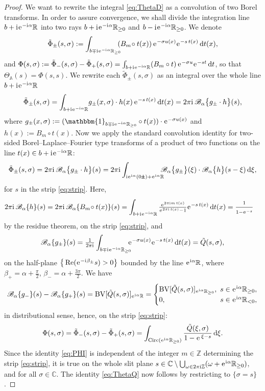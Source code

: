 \documentclass[a4paper,11pt]{amsart}
\numberwithin{equation}{section}
\newcommand{\C}{{\mathbb C}}
\newcommand{\Z}{{\mathbb Z}}
\newcommand{\R}{{\mathbb R}}
\newcommand{\mfrac}[2]{\tfrac{#1\strut}{#2\strut}}
\newcommand{\sminus}{\setminus} %
\renewcommand{\Re}{\operatorname{Re}}
\renewcommand{\i}{\mathrm{i}\mkern.25\thinmuskip}
\renewcommand{\d}{\ensuremath{\operatorname{d}\!}}
\newcommand{\e}{\ensuremath{\mkern.25\thinmuskip\mathrm{e}\mkern.4\thinmuskip}}
\newcommand{\orbit}{\mathbb{A}}
\newcommand{\Borel}{\mathscr{B}}
\newcommand{\BV}{\operatorname{BV}}
\newcommand{\Circ}{\operatorname{Circ}}
\newcommand{\pms}{{\scalebox{0.7}{$\pmb{\pm}$}}}
\theoremstyle{definition}
\begin{document}
\begin{proof}
We want to rewrite the integral \eqref{eq:ThetaD} as a convolution of two Borel transforms. In order to assure convergence, we shall divide the integration line $b+\i\e^{-\i\alpha}\R$ into two rays 
$b+\i\e^{-\i\alpha}\R_{\geq 0}$ and $b-\i \e^{-\i\alpha}\R_{\geq 0}$. 
We denote
\[\tilde\Phi_\pm(s,\sigma):=\int_{b\mp\i \e^{-\i\alpha}\R_{\geq 0}}\!\!\!(B_m\!\circ t(x))\,\e^{-\sigma u(x)}\e^{-s\,t(x)}\d t(x),\]
and $\Phi(s,\sigma):=\tilde\Phi_-(s,\sigma)-\tilde\Phi_+(s,\sigma)=\int_{b+\i\e^{-\i\alpha}\R}(B_m\circ t)\,\e^{-\sigma u}\e^{-st}\d t$, so that $\Theta_\orbit(s)=\Phi(s,s)$.
We rewrite each $\tilde\Phi_\pm(s,\sigma)$ as an integral over the whole line $b+\i\e^{-\i\alpha}\R$
\[\tilde\Phi_\pm(s,\sigma)=\int_{b+\i\e^{-\i\alpha}\R}\!
g_\pm(x,\sigma)\cdot h(x)\,\e^{-s\,t(x)}\d t(x)=
2\pi\i\,\Borel_\alpha\big\{g_\pm\cdot h\big\}(s),
\]
where
$g_\pm(x,\sigma):= (\mathbbm{1}_{b\mp\i\e^{-\i\alpha}\R_{\geq 0} } \circ t(x))\cdot\e^{-\sigma u(x)}$ and $h(x):=B_m\!\circ t(x)$.
Now we apply the standard convolution identity
for two-sided Borel--Laplace--Fourier type transforms of a product of two functions on the line $t(x)\in b+\i\e^{-\i\alpha}\R$: 
\[\tilde \Phi_\pm(s,\sigma)=2\pi\i\,\Borel_\alpha\big\{g_\pm \cdot h\big\}(s)
=2\pi\i\int_{\i\e^{\i\alpha}(0\pms)+\e^{\i\alpha}\R}\!\!\!\!
\Borel_\alpha\big\{g_\pm\big\}(\xi)\cdot\Borel_\alpha\big\{h\big\}(s-\xi)\d\xi,\]
for $s$ in the strip \eqref{eq:strip}.
Here,
\begin{align*}
2\pi\i\,\Borel_\alpha\{h\}(s)&=2\pi\i\,\Borel_\alpha\{B_m\!\circ t(x)\}(s)=
\int_{b+\i\e^{-\i\alpha}\R} \tfrac{\e^{2\pi\i m\,t(x)}}{\e^{2\pi\i\, t(x)}-1}\e^{-s\,t(x)}\d t(x) =\mfrac{1}{1-\e^{-s}}
\end{align*}
by the residue theorem, on the strip \eqref{eq:strip}, and
\[\Borel_\alpha\{g_\pm\}(s)= \tfrac{1}{2\pi\i}\int_{b\mp\i\e^{-\i\alpha}\R_{\geq 0}}\!\!\!\! \e^{-\sigma u(x)}\e^{-s\,t(x)}\d t(x) = \tilde Q(s,\sigma), \]
on the half-plane 
$\big\{\Re(\e^{-\i\beta_\pm}s)>0\big\}$ bounded by the line $\e^{\i\alpha}\R$,
where $\beta_+=\alpha+\frac\pi2$, $\beta_-=\alpha+\frac{3\pi}{2}$. 
We have
\[\Borel_\alpha\{g_-\}(s)-\Borel_\alpha\{g_+\}(s)=\BV[\tilde Q(s,\sigma)]_{\e^{\i\alpha}\R}=
\begin{cases}
\BV[\tilde Q(s,\sigma)]_{\e^{\i\alpha}\R_{\geq0}},\!\!\! & s\in\e^{\i\alpha}\R_{\geq 0},\\0,&s\in\e^{\i\alpha}\R_{<0},
\end{cases}
\]
in distributional sense, hence, on the strip \eqref{eq:strip}:
\begin{equation}\label{eq:PHI}
\Phi(s,\sigma)=\tilde\Phi_-(s,\sigma)-\tilde\Phi_+(s,\sigma)=\int_{\Circ(\e^{\i\alpha}\R_{\geq 0})} \frac{\tilde Q(\xi,\sigma)}{1-\e^{\,\xi-s}}\d\xi.
\end{equation}
Since  the identity \eqref{eq:PHI} is independent of the integer $m\in\Z$ determining the strip \eqref{eq:strip}, it is true on the whole slit plane $s\in\C\sminus\bigcup_{\omega\in 2\pi\i \Z}(\omega+\e^{\i\alpha}\R_{\geq 0})$, and for all $\sigma\in\C$.
The identity \eqref{eq:ThetaQ} now follows by restricting to $\{\sigma=s\}$. 
\end{proof}
\end{document}
